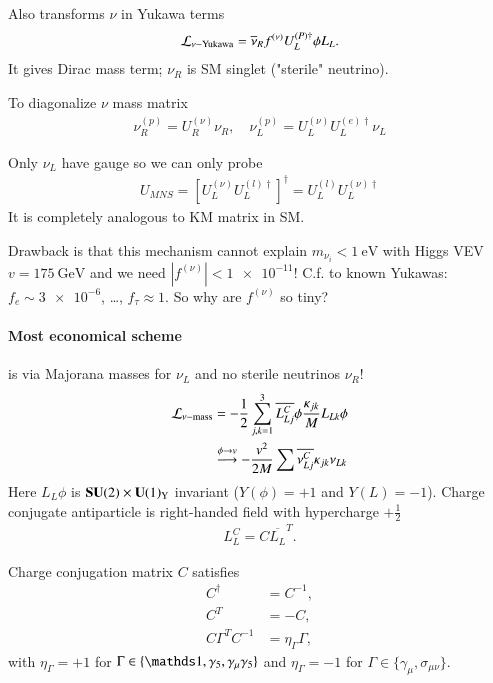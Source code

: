 Also transforms $\nu$ in Yukawa terms
\begin{align}
   \mathcal{L}_{\nu-\text{Yukawa}} = \overline{\nu}_R f^{(\nu)} U_L^{(P)\dagger} \phi L_L.
\end{align}
It gives Dirac mass term; $\nu_R$ is SM singlet ("sterile" neutrino).

To diagonalize $\nu$ mass matrix
\begin{align}
   \nu_R^{(p)} = U_R^{(\nu)} \nu_R, \quad \nu_L^{(p)} = U_L^{(\nu)} U_L^{(e)\dagger}\nu_L
\end{align}

Only $\nu_L$ have gauge so we can only probe 
\begin{align}
   U_{MNS} = \left[ U_L^{(\nu)} U_L^{(l)\dagger} \right]^\dagger = U_L^{(l)} U_L^{(\nu)\dagger}
\end{align}
It is completely analogous to KM matrix in SM.

Drawback is that this mechanism cannot explain $m_{\nu_i} < \SI{1}{\eV}$ with Higgs VEV $v =\SI{175}{\giga\eV}$ and we need $|f^{(\nu)}| < \num{1e-11}$! C.f. to known Yukawas: $f_e \sim \num{3e-6}$, \dots, $f_\tau \approx 1$. So why are $f^{(\nu)}$ so tiny?

\paragraph{Most economical scheme} is via Majorana masses for $\nu_L$ and no sterile neutrinos $\nu_R$!
\begin{align}
   \mathcal{L}_{\nu-\text{mass}} &= -\frac{1}{2} \sum_{j,k=1}^3 \overline{L^C_{Lj}} \phi \frac{\kappa_{jk}}{M} L_{Lk} \phi  \label{1.41} \\
                          & \stackrel{\phi\rightarrow v}{\longrightarrow} - \frac{v^2}{2M} \sum  \overline{\nu^C_{Lj}} \kappa_{jk} \nu_{Lk} \notag 
\end{align}
Here $L_L \phi$ is $\mathbf{SU}(2) \times \mathbf{U}(1)_\text{Y}$ invariant ($Y(\phi)=+1$ and $Y(L)=-1$).
Charge conjugate antiparticle is right-handed field with hypercharge $+\frac{1}{2}$
\begin{align}
   L_L^C = C \overline{L_L}^T.
\end{align}

Charge conjugation matrix $C$ satisfies
\begin{subequations}
   \label{1.42}
\begin{align}
   C^\dagger &= C^{-1}, \label{1.42a}\\
   C^T &= -C,  \label{1.42b}\\
   C \Gamma^T C^{-1} &= \eta_\Gamma \Gamma \label{1.42c},
\end{align}
\end{subequations}
with $\eta_\Gamma = +1 $ for $\Gamma \in \{\id, \gamma_5, \gamma_\mu \gamma_5\}$ and $\eta_\Gamma = -1$ for $\Gamma \in \{\gamma_\mu, \sigma_{\mu\nu}\}$.

